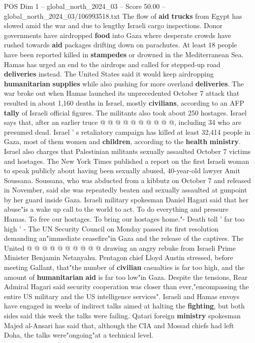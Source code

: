 \begin{textsample}{POS Dim 1 – global\_north\_2024\_03 – Score 50.00 – global\_north\_2024\_03/106993518.txt}
The flow of \textbf{aid} \textbf{trucks} from Egypt has slowed amid the war and due to lengthy Israeli cargo inspections.
Donor governments have airdropped \textbf{food} into Gaza where desperate crowds have rushed towards \textbf{aid} packages drifting down on parachutes.
At least 18 people have been reported killed in \textbf{stampedes} or drowned in the Mediterranean Sea.
Hamas has urged an end to the airdrops and called for stepped-up road \textbf{deliveries} instead.
The United States said it would keep airdropping \textbf{humanitarian} \textbf{supplies} while also pushing for more overland \textbf{deliveries}.
The war broke out when Hamas launched its unprecedented October 7 attack that resulted in about 1,160 deaths in Israel, mostly \textbf{civilians}, according to an AFP \textbf{tally} of Israeli official figures.
The militants also took about 250 hostages.
Israel says that, after an earlier truce @ @ @ @ @ @ @ @ @ @, including 34 who are presumed dead.
Israel ' s retaliatory campaign has killed at least 32,414 people in Gaza, most of them women and \textbf{children}, according to the \textbf{health} \textbf{ministry}.
Israel also charges that Palestinian militants sexually assaulted October 7 victims and hostages.
The New York Times published a report on the first Israeli woman to speak publicly about having been sexually abused, 40-year-old lawyer Amit Soussana.
Soussana, who was abducted from a kibbutz on October 7 and released in November, said she was repeatedly beaten and sexually assaulted at gunpoint by her guard inside Gaza.
Israeli military spokesman Daniel Hagari said that her abuse"is a wake up call to the world to act.
To do everything and pressure Hamas.
To free our hostages.
To bring our hostages home."- Death toll ' far too high ' - The UN Security Council on Monday passed its first resolution demanding an"immediate ceasefire"in Gaza and the release of the captives.
The United @ @ @ @ @ @ @ @ @ @ drawing an angry rebuke from Israeli Prime Minister Benjamin Netanyahu.
Pentagon chief Lloyd Austin stressed, before meeting Gallant, that"the number of \textbf{civilian} casualties is far too high, and the amount of \textbf{humanitarian} \textbf{aid} is far too low"in Gaza.
Despite the tensions, Rear Admiral Hagari said security cooperation was closer than ever,"encompassing the entire US military and the US intelligence services".
Israeli and Hamas envoys have engaged in weeks of indirect talks aimed at halting the \textbf{fighting}, but both sides said this week the talks were failing.
Qatari foreign \textbf{ministry} spokesman Majed al-Ansari has said that, although the CIA and Mossad chiefs had left Doha, the talks were"ongoing"at a technical level.

\end{textsample}

